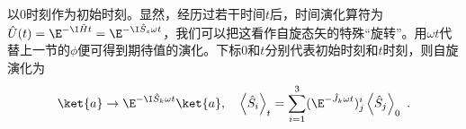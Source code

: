 以$0$时刻作为初始时刻。显然，经历过若干时间$t$后，时间演化算符为$\hat U(t)=\E^{-\I\hat H t}=\E^{-\I\hat S_z\omega t}$，我们可以把这看作自旋态矢的特殊“旋转”。用$\omega t$代替上一节的$\phi$便可得到期待值的演化。下标$0$和$t$分别代表初始时刻和$t$时刻，则自旋演化为
\begin{equation}
\ket{a}\rightarrow \E^{-\I \hat S_k\omega t}\ket{a},\quad \left\langle \hat S_{i}\right\rangle_t=\sum^{3}_{i=1}(\E^{-\hat J_k\omega t})^i_j\left\langle \hat S_{j}\right\rangle_0 ~.
\end{equation}




